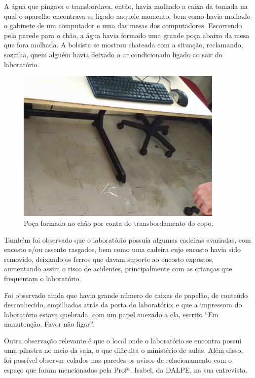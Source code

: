 A água que pingava e transbordava, então, havia molhado a caixa da tomada na qual o aparelho encontrava-se ligado naquele momento, bem como havia molhado o gabinete de um computador e uma das mesas dos computadores. Escorrendo pela parede para o chão, a água havia formado uma grande poça abaixo da mesa que fora molhada. A bolsista se mostrou chateada com a situação, reclamando, sozinha, quem alguém havia deixado o ar condicionado ligado ao sair do laboratório.

\begin{figure}[ht]
  \centering
  \includegraphics[width=0.9\textwidth]{imagens/poca.jpg}
  \caption{Poça formada no chão por conta do transbordamento do copo.}
  \label{fig:LABEL_FIG_POCA}
\end{figure}

Também foi observado que o laboratório possuía algumas cadeiras avariadas, com encosto e/ou assento rasgados, bem como uma cadeira cujo encosto havia sido removido, deixando os ferros que davam suporte ao encosto expostos, aumentando assim o risco de acidentes, principalmente com as crianças que frequentam o laboratório. 

Foi observado ainda que havia grande número de caixas de papelão, de conteúdo desconhecido, empilhadas atrás da porta do laboratório; e que a impressora do laboratório estava quebrada, com um papel anexado a ela, escrito “Em manutenção. Favor não ligar”.

Outra observação relevante é que o local onde o laboratório se encontra possui uma pilastra no meio da sala, o que dificulta o ministério de aulas. Além disso, foi possível observar colados nas paredes os avisos de relacionamento com o espaço que foram mencionados pela Profª. Isabel, da DALPE, na sua entrevista.

